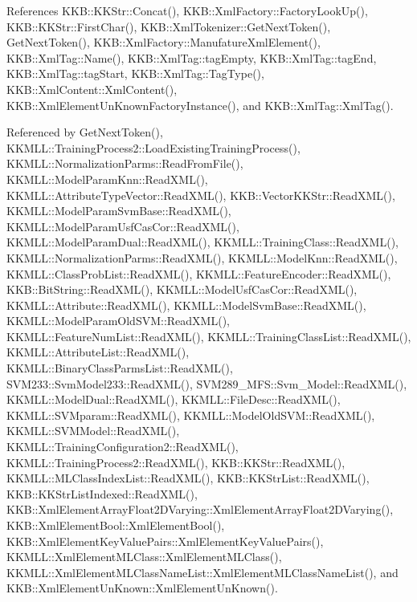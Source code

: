 References K\+K\+B\+::\+K\+K\+Str\+::\+Concat(), K\+K\+B\+::\+Xml\+Factory\+::\+Factory\+Look\+Up(), K\+K\+B\+::\+K\+K\+Str\+::\+First\+Char(), K\+K\+B\+::\+Xml\+Tokenizer\+::\+Get\+Next\+Token(), Get\+Next\+Token(), K\+K\+B\+::\+Xml\+Factory\+::\+Manufature\+Xml\+Element(), K\+K\+B\+::\+Xml\+Tag\+::\+Name(), K\+K\+B\+::\+Xml\+Tag\+::tag\+Empty, K\+K\+B\+::\+Xml\+Tag\+::tag\+End, K\+K\+B\+::\+Xml\+Tag\+::tag\+Start, K\+K\+B\+::\+Xml\+Tag\+::\+Tag\+Type(), K\+K\+B\+::\+Xml\+Content\+::\+Xml\+Content(), K\+K\+B\+::\+Xml\+Element\+Un\+Known\+Factory\+Instance(), and K\+K\+B\+::\+Xml\+Tag\+::\+Xml\+Tag().



Referenced by Get\+Next\+Token(), K\+K\+M\+L\+L\+::\+Training\+Process2\+::\+Load\+Existing\+Training\+Process(), K\+K\+M\+L\+L\+::\+Normalization\+Parms\+::\+Read\+From\+File(), K\+K\+M\+L\+L\+::\+Model\+Param\+Knn\+::\+Read\+X\+M\+L(), K\+K\+M\+L\+L\+::\+Attribute\+Type\+Vector\+::\+Read\+X\+M\+L(), K\+K\+B\+::\+Vector\+K\+K\+Str\+::\+Read\+X\+M\+L(), K\+K\+M\+L\+L\+::\+Model\+Param\+Svm\+Base\+::\+Read\+X\+M\+L(), K\+K\+M\+L\+L\+::\+Model\+Param\+Usf\+Cas\+Cor\+::\+Read\+X\+M\+L(), K\+K\+M\+L\+L\+::\+Model\+Param\+Dual\+::\+Read\+X\+M\+L(), K\+K\+M\+L\+L\+::\+Training\+Class\+::\+Read\+X\+M\+L(), K\+K\+M\+L\+L\+::\+Normalization\+Parms\+::\+Read\+X\+M\+L(), K\+K\+M\+L\+L\+::\+Model\+Knn\+::\+Read\+X\+M\+L(), K\+K\+M\+L\+L\+::\+Class\+Prob\+List\+::\+Read\+X\+M\+L(), K\+K\+M\+L\+L\+::\+Feature\+Encoder\+::\+Read\+X\+M\+L(), K\+K\+B\+::\+Bit\+String\+::\+Read\+X\+M\+L(), K\+K\+M\+L\+L\+::\+Model\+Usf\+Cas\+Cor\+::\+Read\+X\+M\+L(), K\+K\+M\+L\+L\+::\+Attribute\+::\+Read\+X\+M\+L(), K\+K\+M\+L\+L\+::\+Model\+Svm\+Base\+::\+Read\+X\+M\+L(), K\+K\+M\+L\+L\+::\+Model\+Param\+Old\+S\+V\+M\+::\+Read\+X\+M\+L(), K\+K\+M\+L\+L\+::\+Feature\+Num\+List\+::\+Read\+X\+M\+L(), K\+K\+M\+L\+L\+::\+Training\+Class\+List\+::\+Read\+X\+M\+L(), K\+K\+M\+L\+L\+::\+Attribute\+List\+::\+Read\+X\+M\+L(), K\+K\+M\+L\+L\+::\+Binary\+Class\+Parms\+List\+::\+Read\+X\+M\+L(), S\+V\+M233\+::\+Svm\+Model233\+::\+Read\+X\+M\+L(), S\+V\+M289\+\_\+\+M\+F\+S\+::\+Svm\+\_\+\+Model\+::\+Read\+X\+M\+L(), K\+K\+M\+L\+L\+::\+Model\+Dual\+::\+Read\+X\+M\+L(), K\+K\+M\+L\+L\+::\+File\+Desc\+::\+Read\+X\+M\+L(), K\+K\+M\+L\+L\+::\+S\+V\+Mparam\+::\+Read\+X\+M\+L(), K\+K\+M\+L\+L\+::\+Model\+Old\+S\+V\+M\+::\+Read\+X\+M\+L(), K\+K\+M\+L\+L\+::\+S\+V\+M\+Model\+::\+Read\+X\+M\+L(), K\+K\+M\+L\+L\+::\+Training\+Configuration2\+::\+Read\+X\+M\+L(), K\+K\+M\+L\+L\+::\+Training\+Process2\+::\+Read\+X\+M\+L(), K\+K\+B\+::\+K\+K\+Str\+::\+Read\+X\+M\+L(), K\+K\+M\+L\+L\+::\+M\+L\+Class\+Index\+List\+::\+Read\+X\+M\+L(), K\+K\+B\+::\+K\+K\+Str\+List\+::\+Read\+X\+M\+L(), K\+K\+B\+::\+K\+K\+Str\+List\+Indexed\+::\+Read\+X\+M\+L(), K\+K\+B\+::\+Xml\+Element\+Array\+Float2\+D\+Varying\+::\+Xml\+Element\+Array\+Float2\+D\+Varying(), K\+K\+B\+::\+Xml\+Element\+Bool\+::\+Xml\+Element\+Bool(), K\+K\+B\+::\+Xml\+Element\+Key\+Value\+Pairs\+::\+Xml\+Element\+Key\+Value\+Pairs(), K\+K\+M\+L\+L\+::\+Xml\+Element\+M\+L\+Class\+::\+Xml\+Element\+M\+L\+Class(), K\+K\+M\+L\+L\+::\+Xml\+Element\+M\+L\+Class\+Name\+List\+::\+Xml\+Element\+M\+L\+Class\+Name\+List(), and K\+K\+B\+::\+Xml\+Element\+Un\+Known\+::\+Xml\+Element\+Un\+Known().


